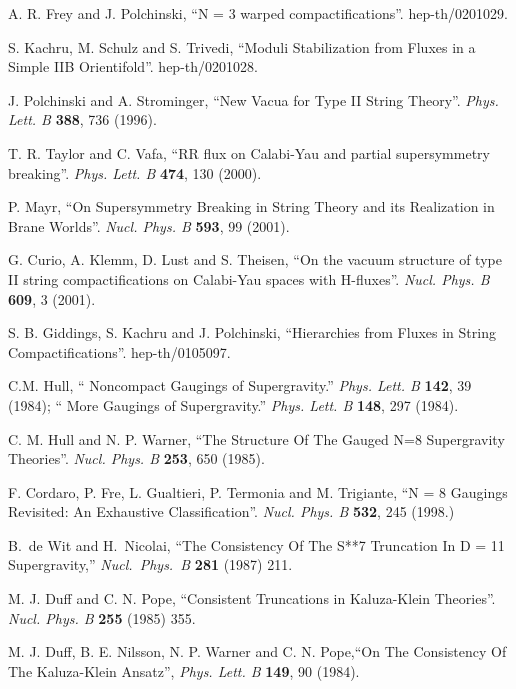 \documentclass[a4paper,12pt]{article}
\begin{document}
\begin{thebibliography}{99}
A. R. Frey and J. Polchinski, ``N = 3 warped compactifications''.
hep-th/0201029.



S. Kachru, M. Schulz and S. Trivedi,
 ``Moduli Stabilization from Fluxes in a Simple IIB Orientifold''.
 hep-th/0201028.

J. Polchinski and A. Strominger, ``New Vacua for Type II String
Theory''. {\it Phys.  Lett.  B} {\bf 388}, 736 (1996).



T. R. Taylor and C. Vafa, ``RR flux on Calabi-Yau and partial
supersymmetry breaking''. {\it Phys. Lett. B} {\bf 474}, 130
(2000).

P. Mayr, ``On Supersymmetry Breaking in String Theory and its
Realization in Brane Worlds''. {\it Nucl.  Phys.  B} {\bf 593}, 99
(2001).

G. Curio, A. Klemm, D. Lust and S. Theisen, ``On the vacuum
structure of type II string compactifications on  Calabi-Yau
spaces with H-fluxes''. {\it Nucl. Phys. B} {\bf 609}, 3 (2001).


 S. B. Giddings, S. Kachru and J. Polchinski,
``Hierarchies from Fluxes in String Compactifications''.
hep-th/0105097.


C.M. Hull, `` Noncompact Gaugings of \coordHE{} Supergravity.'' {\it
Phys. Lett. B} {\bf 142}, 39 (1984); `` More Gaugings of \coordHE{}
Supergravity.'' {\it Phys. Lett. B} {\bf 148}, 297 (1984).


C. M. Hull and N. P. Warner, ``The Structure Of The Gauged N=8
Supergravity Theories''. {\it Nucl.  Phys. B} {\bf 253}, 650
(1985).




F. Cordaro, P. Fre, L. Gualtieri, P. Termonia and M. Trigiante,
``N = 8 Gaugings Revisited: An Exhaustive Classification''. {\it
Nucl. Phys. B } {\bf 532}, 245 (1998.)

B.~de Wit and H.~Nicolai,
``The Consistency Of The S**7 Truncation In D = 11 Supergravity,''
{\it Nucl.\ Phys.\ B} {\bf 281} (1987) 211.


M. J. Duff and C. N. Pope, ``Consistent Truncations in
Kaluza-Klein Theories''. {\it Nucl. Phys. B }{\bf 255} (1985) 355.

M. J. Duff, B. E. Nilsson, N. P. Warner and C. N. Pope,``On The
Consistency Of The Kaluza-Klein Ansatz'', {\it Phys. Lett. B} {\bf
149}, 90 (1984).



\end{thebibliography}
\end{document}
